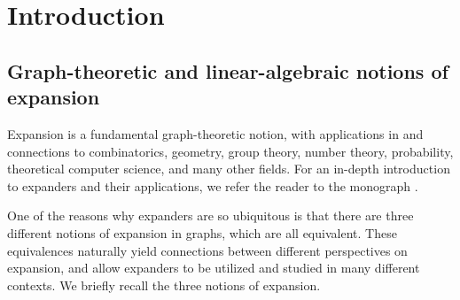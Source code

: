\documentclass{toc}
\theoremstyle{plain}
\numberwithin{equation}{section}
\theoremstyle{definition}
\begin{document}
\begin{frontmatter}
%

\end{frontmatter}

%
%
%

%


\section{Introduction}
\subsection{Graph-theoretic and linear-algebraic notions of expansion}\label{subsec:overview}

Expansion is a fundamental graph-theoretic notion, with applications in and connections to combinatorics, geometry, group theory, number theory, probability, theoretical computer science, and many other fields. For an in-depth introduction to expanders and their applications, we refer the reader to the monograph \cite{HLW06}.

One of the reasons why expanders are so ubiquitous is that there are three different notions of expansion in graphs, which are all equivalent. These equivalences naturally yield connections between different perspectives on expansion, and allow expanders to be utilized and studied in many different contexts. We briefly recall the three notions of expansion.
\end{document}
